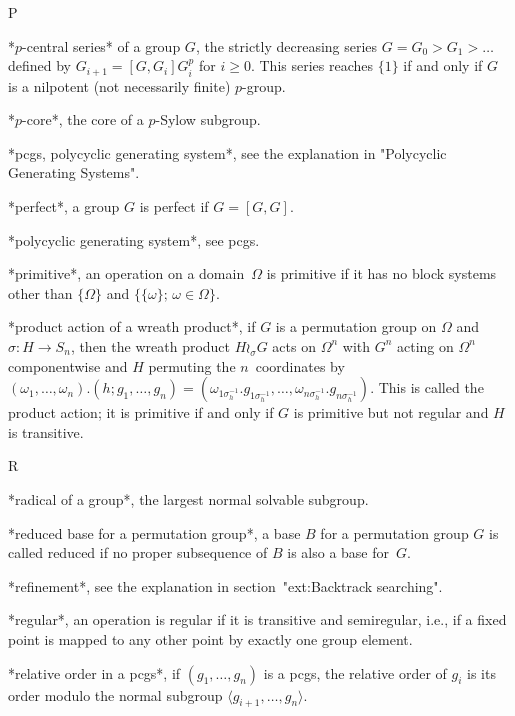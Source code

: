  P

*$p$-central series* of a group $G$, the strictly  decreasing series $G =
G_0 > G_1 > \ldots$ defined by $G_{i+1} = [G,G_i]G_i^p$ for $i\ge0$. This
series reaches $\{1\}$ if and only if $G$ is a nilpotent (not necessarily
finite) $p$-group.

*$p$-core*, the core of a $p$-Sylow subgroup.

*pcgs, polycyclic generating  system*, see the explanation in "Polycyclic
Generating Systems".

*perfect*, a group $G$ is perfect if $G=[G,G]$.

*polycyclic generating system*, see pcgs.

*primitive*, an operation on a domain~$\Omega$ is primitive  if it has no
block  systems other  than   $\{\Omega\}$  and  $\{\{\omega\};\,\omega\in
\Omega\}$.

*product  action of a wreath  product*, if $G$  is a permutation group on
$\Omega$  and    $\sigma\colon H\to    S_n$,   then  the  wreath  product
$H\wr_\sigma G$ acts   on  $\Omega^n$ with  $G^n$  acting on   $\Omega^n$
componentwise     and      $H$  permuting     the    $n$~coordinates   by
$(\omega_1,\ldots,\omega_n).               (h;g_1,\ldots,g_n)           =
(\omega_{1\sigma_h^{-1}}.             g_{1\sigma_h^{-1}},         \ldots,
\omega_{n\sigma_h^{-1}}. g_{n\sigma_h^{-1}})$. This is called the product
action; it is primitive if  and only if  $G$ is primitive but not regular
and $H$ is transitive.

 R

*radical of a group*, the largest normal solvable subgroup.

*reduced  base  for a permutation group*,  a  base  $B$ for a permutation
group  $G$ is called reduced  if no proper subsequence of  $B$  is also a
base for~$G$.

*refinement*, see the explanation in section~"ext:Backtrack searching".

*regular*, an  operation is regular if  it is transitive and semiregular,
i.e., if a fixed point is mapped to any other point  by exactly one group
element.

*relative order in a pcgs*, if $(g_1,\ldots,g_n)$ is a pcgs, the relative
order    of $g_i$   is   its    order     modulo the  normal     subgroup
$\langle g_{i+1},\ldots,g_n\rangle$.


